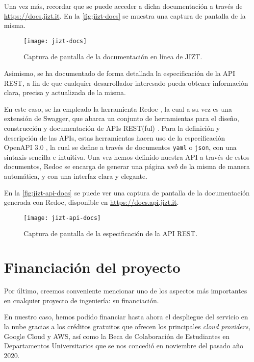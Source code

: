 Una vez más, recordar que se puede acceder a dicha documentación a través de \href{https://dmlls.github.io/jizt-tfg}{https://docs.jizt.it}. En la \autoref{fig:jizt-docs} se muestra una captura de pantalla de la misma.

\begin{figure}[h]
	\centering
	\texttt{[image: jizt-docs]}
	\caption{Captura de pantalla de la documentación en línea de JIZT.}
	\label{fig:jizt-docs}
\end{figure}

Asimismo, se ha documentado de forma detallada la especificación de la API REST, a fin de que cualquier desarrollador interesado pueda obtener información clara, precisa y actualizada de la misma.

En este caso, se ha empleado la herramienta Redoc \cite{redoc}, la cual a su vez es una extensión de Swagger, que abarca un conjunto de herramientas para el diseño, construcción y documentación de APIs REST(ful) \cite{swagger}. Para la definición y descripción de las APIs, estas herramientas hacen uso de la especificación OpenAPI 3.0 \cite{openapi}, la cual se define a través de documentos \texttt{yaml} o \texttt{json}, con una sintaxis sencilla e intuitiva. Una vez hemos definido nuestra API a través de estos documentos, Redoc se encarga de generar una página \emph{web} de la misma de manera automática, y con una interfaz clara y elegante.

En la \autoref{fig:jizt-api-docs} se puede ver una captura de pantalla de la documentación generada con Redoc, disponible en \href{https://dmlls.github.io/jizt-tfg}{https://docs.api.jizt.it}.

\newpage

\begin{figure}[h]
	\centering
	\texttt{[image: jizt-api-docs]}
	\caption{Captura de pantalla de la especificación de la API REST.}
	\label{fig:jizt-api-docs}
\end{figure}

\section{Financiación del proyecto}

Por último, creemos conveniente mencionar uno de los aspectos más importantes en cualquier proyecto de ingeniería: su financiación.

En nuestro caso, hemos podido financiar hasta ahora el despliegue del servicio en la nube gracias a los créditos gratuitos que ofrecen los principales \emph{cloud providers}, Google Cloud y AWS, así como la Beca de Colaboración de Estudiantes en Departamentos Universitarios que se nos concedió en noviembre del pasado año 2020.

